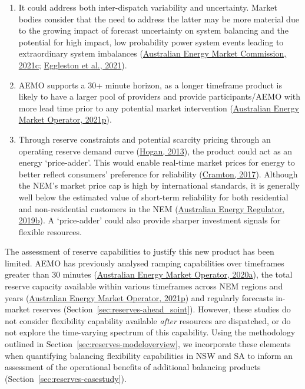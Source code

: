 \documentclass[12pt,a4paper,]{report}
\providecommand{\tightlist}{%
  \setlength{\itemsep}{0pt}\setlength{\parskip}{0pt}}
\begin{document}
\begin{enumerate}
\def\labelenumi{\arabic{enumi}.}
\tightlist
\item
  It could address both inter-dispatch variability and uncertainty.
  Market bodies consider that the need to address the latter may be more
  material due to the growing impact of forecast uncertainty on system
  balancing and the potential for high impact, low probability power
  system events leading to extraordinary system imbalances
  (\protect\hyperlink{ref-australianenergymarketcommissionReserveServicesNational2021}{Australian
  Energy Market Commission, 2021c};
  \protect\hyperlink{ref-egglestonSecurityResilienceTechnical2021}{Eggleston
  et al., 2021}).
\item
  AEMO supports a 30+ minute horizon, as a longer timeframe product is
  likely to have a larger pool of providers and provide
  participants/AEMO with more lead time prior to any potential market
  intervention
  (\protect\hyperlink{ref-australianenergymarketoperatorSubmissionAEMCDirections2021}{Australian
  Energy Market Operator, 2021p}).
\item
  Through reserve constraints and potential scarcity pricing through an
  operating reserve demand curve
  (\protect\hyperlink{ref-hoganElectricityScarcityPricing2013}{Hogan,
  2013}), the product could act as an energy `price-adder'. This would
  enable real-time market prices for energy to better reflect consumers'
  preference for reliability
  (\protect\hyperlink{ref-cramtonElectricityMarketDesign2017}{Cramton,
  2017}). Although the NEM's market price cap is high by international
  standards, it is generally well below the estimated value of
  short-term reliability for both residential and non-residential
  customers in the NEM
  (\protect\hyperlink{ref-australianenergyregulatorValuesCustomerReliability2019}{Australian
  Energy Regulator, 2019b}). A `price-adder' could also provide sharper
  investment signals for flexible resources.
\end{enumerate}

The assessment of reserve capabilities to justify this new product has
been limited. AEMO has previously analysed ramping capabilities over
timeframes greater than 30 minutes
(\protect\hyperlink{ref-australianenergymarketoperatorRenewableIntegrationStudy2020}{Australian
Energy Market Operator, 2020a}), the total reserve capacity available
within various timeframes across NEM regions and years
(\protect\hyperlink{ref-australianenergymarketoperatorSubmissionAEMCDirections2021}{Australian
Energy Market Operator, 2021p}) and regularly forecasts in-market
reserves (Section~\ref{sec:reserves-ahead_soint}). However, these
studies do not consider flexibility capability available \emph{after}
resources are dispatched, or do not explore the time-varying spectrum of
this capability. Using the methodology outlined in
Section~\ref{sec:reserves-modeloverview}, we incorporate these elements
when quantifying balancing flexibility capabilities in NSW and SA to
inform an assessment of the operational benefits of additional balancing
products (Section~\ref{sec:reserves-casestudy}).
\end{document}

